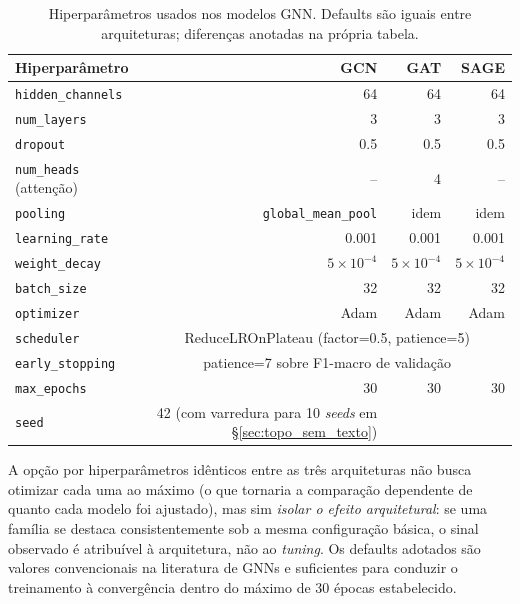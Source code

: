 \begin{table}[H]\centering
\caption{Hiperpar\^ametros usados nos modelos GNN. Defaults s\~ao iguais
entre arquiteturas; diferen\c{c}as anotadas na pr\'opria tabela.}
\label{tab:hyperparams}
\small
\begin{tabular}{lrrr}
\toprule
\textbf{Hiperpar\^ametro} & \textbf{GCN} & \textbf{GAT} & \textbf{SAGE} \\
\midrule
\texttt{hidden\_channels}     & 64     & 64     & 64 \\
\texttt{num\_layers}          & 3      & 3      & 3 \\
\texttt{dropout}              & 0{.}5  & 0{.}5  & 0{.}5 \\
\texttt{num\_heads} (atten\c{c}\~ao) & --     & 4      & -- \\
\texttt{pooling}              & \texttt{global\_mean\_pool} & idem & idem \\
\texttt{learning\_rate}       & 0{.}001 & 0{.}001 & 0{.}001 \\
\texttt{weight\_decay}        & $5\times10^{-4}$ & $5\times10^{-4}$ & $5\times10^{-4}$ \\
\texttt{batch\_size}          & 32     & 32     & 32 \\
\texttt{optimizer}            & Adam   & Adam   & Adam \\
\texttt{scheduler}            & \multicolumn{3}{c}{ReduceLROnPlateau (factor=0{.}5, patience=5)} \\
\texttt{early\_stopping}      & \multicolumn{3}{c}{patience=7 sobre F1-macro de valida\c{c}\~ao} \\
\texttt{max\_epochs}          & 30     & 30     & 30 \\
\texttt{seed}                 & 42 (com varredura para 10 \emph{seeds} em \S\ref{sec:topo_sem_texto}) \\
\bottomrule
\end{tabular}
\end{table}

A op\c{c}\~ao por hiperpar\^ametros id\^enticos entre as tr\^es arquiteturas
n\~ao busca otimizar cada uma ao m\'aximo (o que tornaria a compara\c{c}\~ao
dependente de quanto cada modelo foi ajustado), mas sim \emph{isolar o
efeito arquitetural}: se uma fam\'ilia se destaca consistentemente sob a
mesma configura\c{c}\~ao b\'asica, o sinal observado \'e atribu\'ivel \`a
arquitetura, n\~ao ao \emph{tuning}. Os defaults adotados s\~ao valores
convencionais na literatura de GNNs e suficientes para conduzir o
treinamento \`a converg\^encia dentro do m\'aximo de 30 \'epocas
estabelecido.

